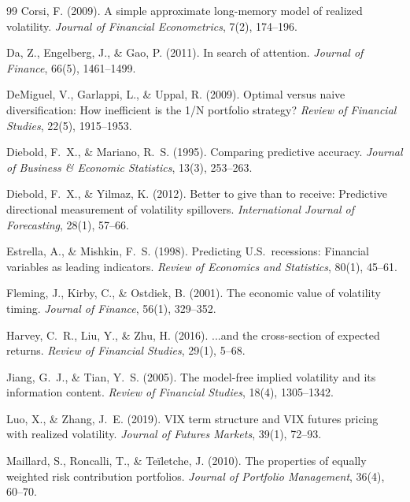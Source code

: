 \documentclass[12pt,a4paper]{article}
\begin{document}
\begin{thebibliography}{99}
Corsi, F. (2009). A simple approximate long-memory model of realized volatility. \textit{Journal of Financial Econometrics}, 7(2), 174--196.

Da, Z., Engelberg, J., \& Gao, P. (2011). In search of attention. \textit{Journal of Finance}, 66(5), 1461--1499.

DeMiguel, V., Garlappi, L., \& Uppal, R. (2009). Optimal versus naive diversification: How inefficient is the 1/N portfolio strategy? \textit{Review of Financial Studies}, 22(5), 1915--1953.

Diebold, F.~X., \& Mariano, R.~S. (1995). Comparing predictive accuracy. \textit{Journal of Business \& Economic Statistics}, 13(3), 253--263.

Diebold, F.~X., \& Yilmaz, K. (2012). Better to give than to receive: Predictive directional measurement of volatility spillovers. \textit{International Journal of Forecasting}, 28(1), 57--66.

Estrella, A., \& Mishkin, F.~S. (1998). Predicting U.S.\ recessions: Financial variables as leading indicators. \textit{Review of Economics and Statistics}, 80(1), 45--61.

Fleming, J., Kirby, C., \& Ostdiek, B. (2001). The economic value of volatility timing. \textit{Journal of Finance}, 56(1), 329--352.

Harvey, C.~R., Liu, Y., \& Zhu, H. (2016). ...and the cross-section of expected returns. \textit{Review of Financial Studies}, 29(1), 5--68.

Jiang, G.~J., \& Tian, Y.~S. (2005). The model-free implied volatility and its information content. \textit{Review of Financial Studies}, 18(4), 1305--1342.

Luo, X., \& Zhang, J.~E. (2019). VIX term structure and VIX futures pricing with realized volatility. \textit{Journal of Futures Markets}, 39(1), 72--93.

Maillard, S., Roncalli, T., \& Te\"{i}letche, J. (2010). The properties of equally weighted risk contribution portfolios. \textit{Journal of Portfolio Management}, 36(4), 60--70.


\end{thebibliography}
\end{document}
